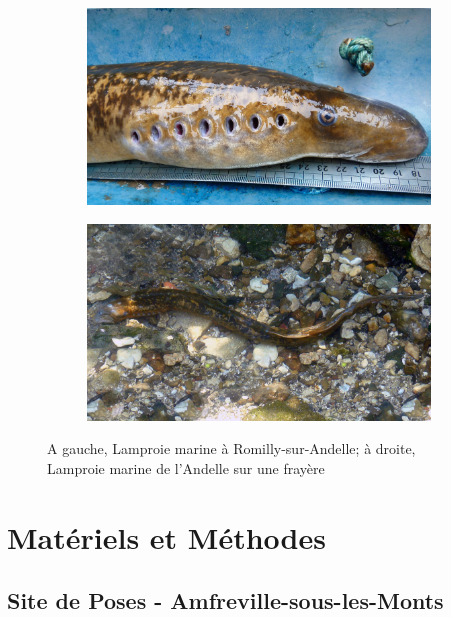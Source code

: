 \documentclass[11pt,titlepage,twoside]{article}\usepackage[]{graphicx}\usepackage[table]{xcolor}
\begin{document}
\begin{figure}[hptb]
    \centering
    \begin{subfigure}[b]{0.45\textwidth}
        \includegraphics[width=\textwidth]{LPM_tete}
    \end{subfigure}
    \begin{subfigure}[b]{0.45\textwidth}
        \includegraphics[width=\textwidth]{LPM_frayere}
    \end{subfigure}
       \caption{A gauche, Lamproie marine à Romilly-sur-Andelle; à droite, Lamproie marine de l'Andelle sur une frayère}
       \label{photo_lamproies}
\end{figure}

\clearpage

\section{Matériels et Méthodes}

\subsection{Site de Poses - Amfreville-sous-les-Monts}
\end{document}
